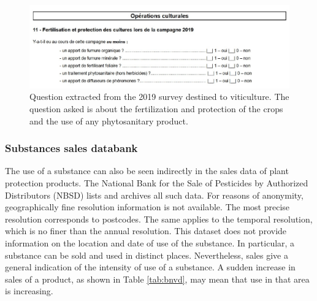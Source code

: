 \begin{figure}[ht]
    \centering
    \includegraphics[scale=0.75]{figs/Chap3/PK1.pdf}
    \caption{Question extracted from the 2019 survey destined to viticulture. The question asked is about the fertilization and protection of the crops and the use of any phytosanitary product.}
    \label{fig:PK1}
\end{figure}

\subsubsection{Substances sales databank}

The use of a substance can also be seen indirectly in the sales data of plant protection products. The National Bank for the Sale of Pesticides by Authorized Distributors (NBSD) \citep{BNVD} lists and archives all such data. For reasons of anonymity, geographically fine resolution information is not available. The most precise resolution corresponds to postcodes. The same applies to the temporal resolution, which is no finer than the annual resolution. This dataset does not provide information on the location and date of use of the substance. In particular, a substance can be sold and used in distinct places. Nevertheless, sales give a general indication of the intensity of use of a substance. A sudden increase in sales of a product, as shown in Table \ref{tab:bnvd}, may mean that use in that area is increasing.
 

